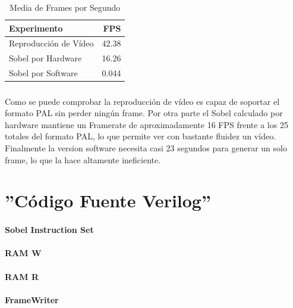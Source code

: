 \documentclass[a4paper,12pt,titlepage,final]{book}
\begin{document}
\begin{table}[hd]
\centering
\begin{tabular}{l r}
Experimento            & FPS \\
\hline
Reproducción de Vídeo  & 42.38 \\
Sobel por Hardware     & 16.26 \\
Sobel por Software     & 0.044 \\
\end{tabular}
\caption{Media de Frames por Segundo}
\label{tab:resutadosf}
\end{table}

\paragraph{}
Como se puede comprobar la reproducción de vídeo es capaz de soportar el formato PAL sin perder ningún frame. Por otra parte el Sobel calculado por hardware mantiene un Framerate de aproximadamente 16 FPS frente a los 25 totales del formato PAL, lo que permite ver con bastante fluidez un vídeo. Finalmente la version software necesita casi 23 segundos para generar un solo frame, lo que la hace altamente ineficiente.

\appendix
\pagestyle{empty}
\appendixpage
\noappendicestocpagenum
\addappheadtotoc

\chapter{''Código Fuente Verilog''}
\subsubsection{Sobel Instruction Set}

\subsubsection{RAM W}

\subsubsection{RAM R}

\subsubsection{FrameWriter}

\end{document}
